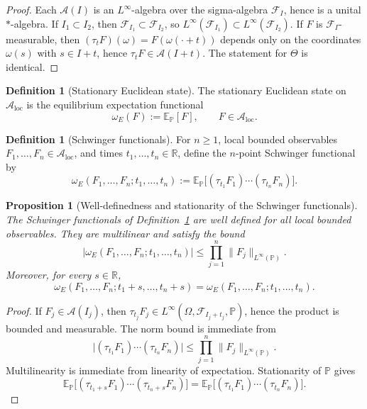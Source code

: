 \documentclass[11pt]{article}
\newtheorem{proposition}[theorem]{Proposition}
\theoremstyle{definition}
\newtheorem{definition}[theorem]{Definition}
\theoremstyle{remark}
\newcommand{\R}{\mathbb R}
\newcommand{\E}{\mathbb E}
\newcommand{\mcA}{\mathcal A}
\newcommand{\mcF}{\mathcal F}
\begin{document}
\begin{proof}
Each \(\mcA(I)\) is an \(L^\infty\)-algebra over the sigma-algebra \(\mcF_I\),
hence is a unital \( * \)-algebra.  If \(I_1\subset I_2\), then
\(\mcF_{I_1}\subset\mcF_{I_2}\), so \(L^\infty(\mcF_{I_1})\subset
L^\infty(\mcF_{I_2})\).  If \(F\) is \(\mcF_I\)-measurable, then
\((\tau_tF)(\omega)=F(\omega(\cdot+t))\) depends only on the coordinates
\(\omega(s)\) with \(s\in I+t\), hence \(\tau_tF\in\mcA(I+t)\).  The statement
for \(\Theta\) is identical.
\end{proof}

\begin{definition}[Stationary Euclidean state]
\label{def:euclidean-state}
The stationary Euclidean state on \(\mcA_{\mathrm{loc}}\) is the equilibrium
expectation functional
\[
\omega_E(F):=\E_{\mathbb P}[F],
\qquad F\in\mcA_{\mathrm{loc}}.
\]
\end{definition}

\begin{definition}[Schwinger functionals]
\label{def:schwinger}
For \(n\ge1\), local bounded observables \(F_1,\dots,F_n\in\mcA_{\mathrm{loc}}\),
and times \(t_1,\dots,t_n\in\R\), define the \(n\)-point Schwinger functional
by
\[
\omega_E(F_1,\dots,F_n;t_1,\dots,t_n)
:=
\E_{\mathbb P}\!\bigl[(\tau_{t_1}F_1)\cdots(\tau_{t_n}F_n)\bigr].
\]
\end{definition}

\begin{proposition}[Well-definedness and stationarity of the Schwinger functionals]
\label{prop:schwinger-basic}
The Schwinger functionals of Definition~\ref{def:schwinger} are well defined
for all local bounded observables.  They are multilinear and satisfy the bound
\[
\left|\omega_E(F_1,\dots,F_n;t_1,\dots,t_n)\right|
\le
\prod_{j=1}^n \|F_j\|_{L^\infty(\mathbb P)}.
\]
Moreover, for every \(s\in\R\),
\[
\omega_E(F_1,\dots,F_n;t_1+s,\dots,t_n+s)
=
\omega_E(F_1,\dots,F_n;t_1,\dots,t_n).
\]
\end{proposition}

\begin{proof}
If \(F_j\in\mcA(I_j)\), then \(\tau_{t_j}F_j\in
L^\infty(\Omega,\mcF_{I_j+t_j},\mathbb P)\), hence the product is bounded and
measurable.  The norm bound is immediate from
\[
\bigl|(\tau_{t_1}F_1)\cdots(\tau_{t_n}F_n)\bigr|
\le
\prod_{j=1}^n \|F_j\|_{L^\infty(\mathbb P)}.
\]
Multilinearity is immediate from linearity of expectation.  Stationarity of
\(\mathbb P\) gives
\[
\E_{\mathbb P}\!\bigl[(\tau_{t_1+s}F_1)\cdots(\tau_{t_n+s}F_n)\bigr]
=
\E_{\mathbb P}\!\bigl[(\tau_{t_1}F_1)\cdots(\tau_{t_n}F_n)\bigr].
\]
\end{proof}
\end{document}

